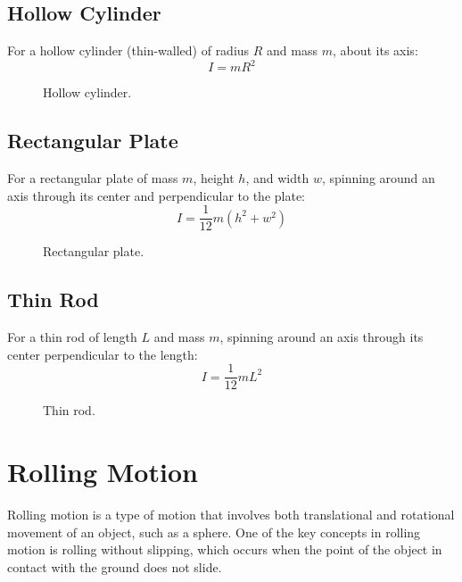 \documentclass[12pt]{article}
\begin{document}
\subsection{Hollow Cylinder}
For a hollow cylinder (thin-walled) of radius \(R\) and mass \(m\), about its axis:
\[
I = mR^2
\]
\begin{figure}[h]
\centering
{}
\caption{Hollow cylinder.}
\end{figure}

\subsection{Rectangular Plate}
For a rectangular plate of mass \(m\), height \(h\), and width \(w\), spinning around an axis through its center and perpendicular to the plate:
\[
I = \frac{1}{12} m(h^2 + w^2)
\]
\begin{figure}[h]
\centering
{}
\caption{Rectangular plate.}
\end{figure}

\subsection{Thin Rod}
For a thin rod of length \(L\) and mass \(m\), spinning around an axis through its center perpendicular to the length:
\[
I = \frac{1}{12} mL^2
\]
\begin{figure}[h]
\centering
{}
\caption{Thin rod.}
\end{figure}
\section{Rolling Motion}

Rolling motion is a type of motion that involves both translational and rotational movement of an object, such as a sphere. One of the key concepts in rolling motion is rolling without slipping, which occurs when the point of the object in contact with the ground does not slide.
\end{document}
